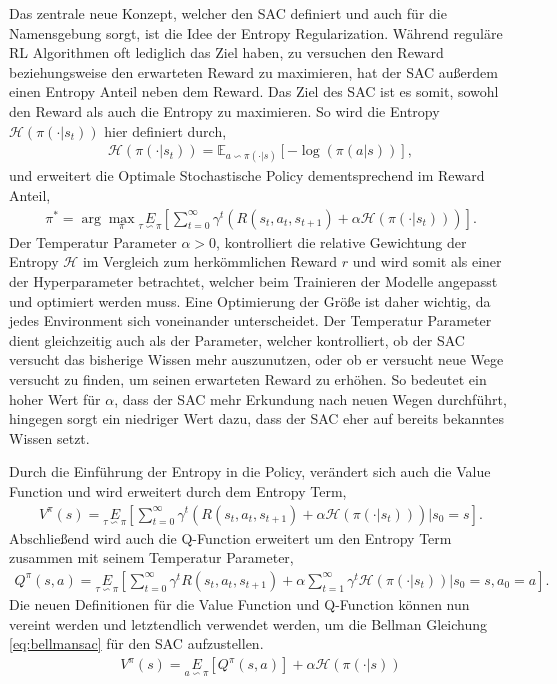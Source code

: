 \documentclass[]{iat}
\begin{document}
Das zentrale neue Konzept, welcher den SAC definiert und auch für die Namensgebung sorgt, ist die Idee der Entropy Regularization. Während reguläre RL Algorithmen oft lediglich das Ziel haben, zu versuchen den Reward beziehungsweise den erwarteten Reward zu maximieren, hat der SAC außerdem einen Entropy Anteil neben dem Reward. Das Ziel des SAC ist es somit, sowohl den Reward als auch die Entropy zu maximieren. So wird die Entropy $\mathcal{H}(\pi(\cdot | s_t))$ hier definiert durch,
\begin{align}
    \mathcal{H}(\pi(\cdot | s_t)) = \mathbb{E}_{a\backsim \pi(\cdot | s)}[-\log(\pi(a|s))],
\end{align}
und erweitert die Optimale Stochastische Policy dementsprechend im Reward Anteil,
\begin{align}
    \pi^* = \arg \max_{\pi} \underset{\tau \backsim \pi}{E} \left[\sum_{t=0}^{\infty} \gamma^t\left(R(s_t, a_t, s_{t+1}) + \alpha \mathcal{H}(\pi(\cdot | s_t))\right)  \right].
\end{align}
Der Temperatur Parameter $\alpha > 0$, kontrolliert die relative Gewichtung der Entropy $\mathcal{H}$ im Vergleich zum herkömmlichen Reward $r$ und wird somit als einer der Hyperparameter betrachtet, welcher beim Trainieren der Modelle angepasst und optimiert werden muss. Eine Optimierung der Größe ist daher wichtig, da jedes Environment sich voneinander unterscheidet. Der Temperatur Parameter dient gleichzeitig auch als der Parameter, welcher kontrolliert, ob der SAC versucht das bisherige Wissen mehr auszunutzen, oder ob er versucht neue Wege versucht zu finden, um seinen erwarteten Reward zu erhöhen. So bedeutet ein hoher Wert für $\alpha$, dass der SAC mehr Erkundung nach neuen Wegen durchführt, hingegen sorgt ein niedriger Wert dazu, dass der SAC eher auf bereits bekanntes Wissen setzt.

Durch die Einführung der Entropy in die Policy, verändert sich auch die Value Function und wird erweitert durch dem Entropy Term,
\begin{align}
    V^{\pi}(s) = \underset{\tau \backsim \pi}{E}\left[\sum_{t = 0}^{\infty} \gamma^t\left(R(s_t, a_t, s_{t+1}) + \alpha \mathcal{H}(\pi(\cdot | s_t))\right) \vert  s_0 = s \right].
\end{align}
Abschließend wird auch die Q-Function erweitert um den Entropy Term zusammen mit seinem Temperatur Parameter,
\begin{align}
    Q^{\pi}(s, a) = \underset{\tau \backsim \pi}{E}\left[\sum_{t = 0}^{\infty} \gamma^t R(s_t, a_t, s_{t+1}) + \alpha \sum_{t = 1}^{\infty} \gamma^t \mathcal{H}(\pi(\cdot | s_t)) \vert s_0 = s, a_0 = a \right].
\end{align}
Die neuen Definitionen für die Value Function und Q-Function können nun vereint werden und letztendlich verwendet werden, um die Bellman Gleichung \ref{eq:bellmansac} für den SAC aufzustellen. \cite[]{sacv2} \cite[]{brockman2016openai}
\begin{align}
    V^{\pi}(s) = \underset{a \backsim \pi}{E} \left[Q^{\pi}(s, a)\right] + \alpha \mathcal{H}(\pi(\cdot | s)) \label{eq:value_sac}
\end{align}
\end{document}
